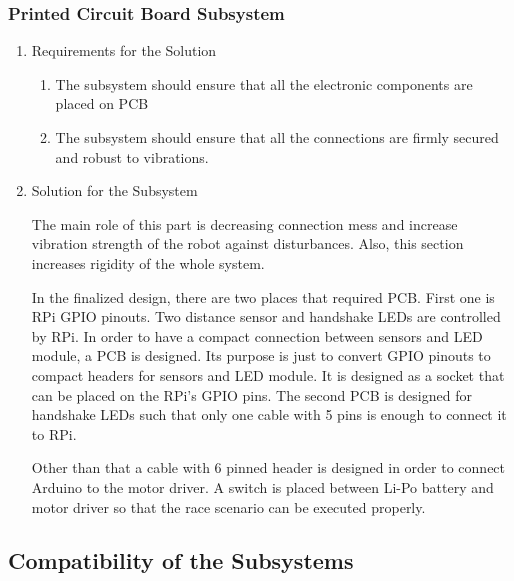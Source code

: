 \documentclass[a4paper,12pt]{article}
\begin{document}

\subsubsection{Printed Circuit Board Subsystem}

	\begin{enumerate}
		\item {Requirements for the Solution}
		
		\begin{enumerate}
			\item The subsystem should ensure that all the electronic components are placed on PCB
			\item The subsystem should ensure that all the connections are firmly secured and robust to vibrations.
		\end{enumerate} 

	\item {Solution for the Subsystem}

		The main role of this part is decreasing connection mess and increase vibration strength of the robot against disturbances. Also, this section increases rigidity of the whole system. 
		
		In the finalized design, there are two places that required PCB. First one is RPi GPIO pinouts. Two distance sensor and handshake LEDs are controlled by RPi. In order to have a compact connection between sensors and LED module, a PCB is designed. Its purpose is just to convert GPIO pinouts to compact headers for sensors and LED module. It is designed as a socket that can be placed on the RPi's GPIO pins. The second PCB is designed for handshake LEDs such that only one cable with 5 pins is enough to connect it to RPi.  
		
		Other than that a cable with 6 pinned header is designed in order to connect Arduino to the motor driver. A switch is placed between Li-Po battery and motor driver so that the race scenario can be executed properly.




	\end{enumerate}	




\subsection{Compatibility of the Subsystems}
\end{document}
